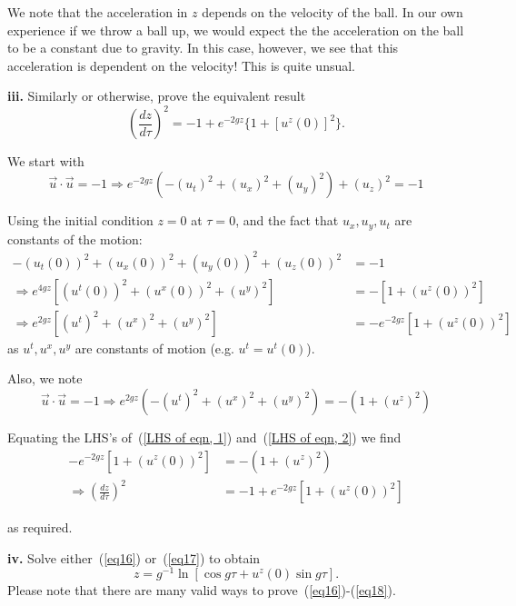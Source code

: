 \documentclass[a4paper]{article} %
\begin{document}
We note that the acceleration in $z$ depends on the velocity of the ball. In our own experience if we throw a ball up, we would expect the the acceleration on the ball to be a constant due to gravity. In this case, however, we see that this acceleration is dependent on the velocity! This is quite unsual.

\begin{framed}
\textbf{iii.} Similarly or otherwise, prove the equivalent result
\begin{equation}
\left(\frac{dz}{d\tau}\right)^2=-1+e^{-2gz}\{1+[u^z(0)]^2\}.\label{eq17}
\end{equation}
\end{framed}

We start with
\begin{equation}
\vec{u}\cdot\vec{u}=-1 \Rightarrow e^{-2gz}\left(-(u_t)^2+(u_x)^2+(u_y)^2\right)
+(u_z)^2=-1
\end{equation}

Using the initial condition $z=0$ at $\tau=0$, and the fact that $u_x,u_y,u_t$ are constants of the motion:
\begin{align}
-\left(u_t(0)\right)^2+\left(u_x(0)\right)^2+\left(u_y(0)\right)^2+\left(u_z(0)\right)^2&=-1 \\
\Rightarrow e^{4gz}\left[\left(u^t(0)\right)^2+\left(u^x(0)\right)^2+\left(u^y\right)^2\right]
&=-\left[1+\left(u^z(0)\right)^2\right]\\
\Rightarrow e^{2gz}\left[\left(u^t\right)^2+\left(u^x\right)^2+\left(u^y\right)^2\right]
&=-e^{-2gz}\left[1+\left(u^z(0)\right)^2\right]\label{LHS of eqn, 1}
\end{align}
as $u^{t},u^{x},u^{y}$ are constants of motion (e.g. $u^t = u^t(0)$).

Also, we note
\begin{equation}
\vec{u}\cdot \vec{u}=-1 \Rightarrow e^{2gz}\left(-(u^t)^2+(u^x)^2+(u^y)^2\right)=
-\left(1+(u^z)^2\right)\label{LHS of eqn, 2}
\end{equation}

Equating the LHS's of~(\ref{LHS of eqn, 1}) and~(\ref{LHS of eqn, 2}) we find
\begin{align}
-e^{-2gz}\left[1+\left(u^z(0)\right)^2\right] & = -\left(1+(u^z)^2\right)\\
\Rightarrow \left(\frac{dz}{d\tau}\right)^2&=-1+e^{-2gz}\left[1+\left(u^z(0)\right)^2\right]
\end{align}

as required.

\begin{framed}
\textbf{iv.} Solve either~(\ref{eq16}) or~(\ref{eq17}) to obtain
\begin{equation}
z=g^{-1}\ln[\cos g\tau+u^z(0)\sin g\tau].\label{eq18}
\end{equation}
Please note that there are many valid ways to prove~(\ref{eq16})-(\ref{eq18}).
\end{framed}
\end{document}
